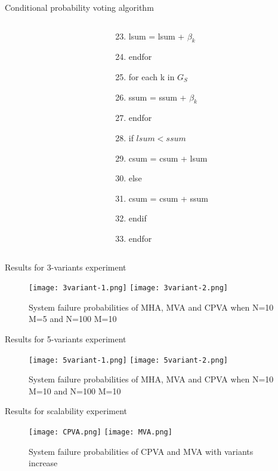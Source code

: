 \documentclass{beamer}
\begin{document}
\begin{frame}{Conditional probability voting algorithm}
\begin{block}{}
\begin{columns}[T]
\begin{column}{.36\textwidth}
            \end{column}
            \begin{column}{.36\textwidth}
                \begin{enumerate}
                \setcounter{enumi}{22}
                    \item lsum = lsum + $\beta_k$
                    \item endfor
                    \item for each k in $G_S$
                    \item ssum = ssum + $\beta_k$
                    \item endfor
                    \item if $lsum < ssum$
                    \item csum = csum + lsum
                    \item else
                    \item csum = csum + ssum
                    \item endif
                    \item endfor
                \end{enumerate}
            \end{column}
        \end{columns}
    \end{block}
\end{frame}
\begin{frame}{Results for 3-variants experiment}
    \begin{figure}[!]
        \centering
        \texttt{[image: 3variant-1.png]}
        \texttt{[image: 3variant-2.png]}
        \caption{System failure probabilities of MHA, MVA and CPVA when N=10 M=5 and N=100 M=10}
    \end{figure}
\end{frame}
\begin{frame}{Results for 5-variants experiment}
    \begin{figure}[!]
        \centering
        \texttt{[image: 5variant-1.png]}
        \texttt{[image: 5variant-2.png]}
        \caption{System failure probabilities of MHA, MVA and CPVA when N=10 M=10 and N=100 M=10}
    \end{figure}
\end{frame}
\begin{frame}{Results for scalability experiment}
    \begin{figure}[!]
        \texttt{[image: CPVA.png]}
        \texttt{[image: MVA.png]}
        \caption{System failure probabilities of CPVA and MVA with variants increase}
    \end{figure}
\end{frame}
\end{document}
